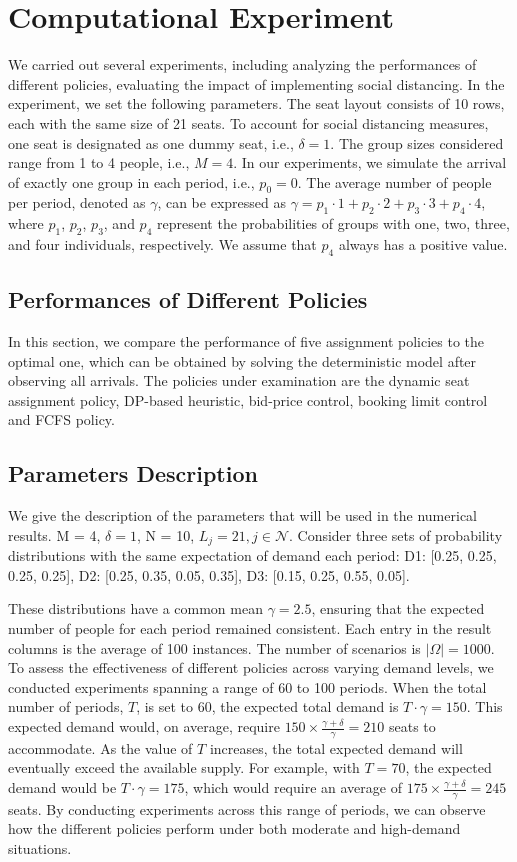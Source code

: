\section{Computational Experiment}
We carried out several experiments, including analyzing the performances of different policies, evaluating the impact of implementing social distancing. In the experiment, we set the following parameters. The seat layout consists of 10 rows, each with the same size of 21 seats. To account for social distancing measures, one seat is designated as one dummy seat, i.e., $\delta =1$. The group sizes considered range from 1 to 4 people, i.e., $M =4$. In our experiments, we simulate the arrival of exactly one group in each period, i.e., $p_0 = 0$. The average number of people per period, denoted as $\gamma$, can be expressed as $\gamma = p_1 \cdot 1 + p_2 \cdot 2 + p_3 \cdot 3 + p_4 \cdot 4$, where $p_1$, $p_2$, $p_3$, and $p_4$ represent the probabilities of groups with one, two, three, and four individuals, respectively. We assume that $p_4$ always has a positive value.

\subsection{Performances of Different Policies}
In this section, we compare the performance of five assignment policies to the optimal one, which can be obtained by solving the deterministic model after observing all arrivals. The policies under examination are the dynamic seat assignment policy, DP-based heuristic, bid-price control, booking limit control and FCFS policy. 

\subsection*{Parameters Description}
We give the description of the parameters that will be used in the numerical results. 
M = 4, $\delta = 1$, N = 10, $L_j = 21, j \in \mathcal{N}$. Consider three sets of probability distributions with the same expectation of demand each period:
D1: [0.25, 0.25, 0.25, 0.25], D2: [0.25, 0.35, 0.05, 0.35], D3: [0.15, 0.25, 0.55, 0.05].

These distributions have a common mean $\gamma = 2.5$, ensuring that the expected number of people for each period remained consistent. Each entry in the result columns is the average of 100 instances. The number of scenarios is $|\Omega| = 1000$. To assess the effectiveness of different policies across varying demand levels, we conducted experiments spanning a range of 60 to 100 periods. When the total number of periods, $T$, is set to 60, the expected total demand is $T \cdot \gamma = 150$. This expected demand would, on average, require $150 \times \frac{\gamma + \delta}{\gamma} = 210$ seats to accommodate. As the value of $T$ increases, the total expected demand will eventually exceed the available supply. For example, with $T = 70$, the expected demand would be $T \cdot \gamma = 175$, which would require an average of $175 \times \frac{\gamma + \delta}{\gamma} = 245$ seats. By conducting experiments across this range of periods, we can observe how the different policies perform under both moderate and high-demand situations.

